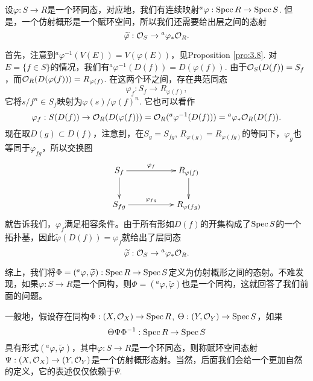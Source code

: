 \begin{para}[仿射概形之间的态射]
设$\varphi:S\to R$是一个环同态，对应地，我们有连续映射${}^a\varphi:\operatorname{Spec} R\to \operatorname{Spec} S$. 但是，一个仿射概形是一个赋环空间，所以我们还需要给出层之间的态射
\[
	\widetilde{\varphi}:\mathcal{O}_S\to {}^a\varphi_*\mathcal{O}_R.
\]

首先，注意到${}^a\varphi^{-1}(V(E))=V(\varphi(E))$，见Proposition \ref{pro:3.8}. 对$E=\{f\in S\}$的情况，我们有${}^a\varphi^{-1}(D(f))=D(\varphi(f))$. 由于$\mathcal{O}_S(D(f))=S_f$，而$\mathcal{O}_R(D(\varphi(f)))=R_{\varphi(f)}$. 在这两个环之间，存在典范同态
\[
	\varphi_f:S_f\to R_{\varphi(f)},
\]
它将$s/f^n\in S_f$映射为$\varphi(s)/\varphi(f)^n$. 它也可以看作
\[
	\varphi_f:S(D(f))\to \mathcal{O}_R(D(\varphi(f)))=\mathcal{O}_R({}^a\varphi^{-1}(D(f)))={}^a\varphi_*\mathcal{O}_R(D(f)).
\]
现在取$D(g)\subset D(f)$，注意到，在$S_g=S_{fg}$, $R_{\varphi(g)}=R_{\varphi(fg)}$的等同下，$\varphi_g$也等同于$\varphi_{fg}$，所以交换图
\[
	\xymatrix{
	S_f\ar[d]\ar[rr]^-{\varphi_f}&&R_{\varphi(f)}\ar[d]\\
	S_{fg}\ar[rr]^-{\varphi_{fg}}&&R_{\varphi(fg)}
	}
\]
就告诉我们，$\varphi_f$满足相容条件。由于所有形如$D(f)$的开集构成了$\operatorname{Spec} S$的一个拓扑基，因此$\widetilde{\varphi}(D(f))=\varphi_f$就给出了层同态
\[
	\widetilde{\varphi}:\mathcal{O}_S\to {}^a\varphi_*\mathcal{O}_R.
\]

综上，我们将$\Phi=({}^a\varphi,\widetilde{\varphi}):\operatorname{Spec} R\to \operatorname{Spec} S$定义为仿射概形之间的态射。不难发现，如果$\varphi:S\to R$是一个同构，则$\Phi=({}^a\varphi,\widetilde{\varphi})$也是一个同构，这就回答了我们前面的问题。

一般地，假设存在同构$\Phi:(X,\mathcal{O}_X)\to \operatorname{Spec} R$, $\Theta:(Y,\mathcal{O}_Y)\to \operatorname{Spec} S$，如果
\[
	\Theta\Psi\Phi^{-1}:\operatorname{Spec} R\to \operatorname{Spec} S
\]
具有形式$({}^a\varphi,\widetilde{\varphi})$，其中$\varphi:S\to R$是一个环同态，则称赋环空间态射$\Psi:(X,\mathcal{O}_X)\to (Y,\mathcal{O}_Y)$是一个仿射概形态射。当然，后面我们会给一个更加自然的定义，它的表述仅仅依赖于$\Psi$.
\end{para}

